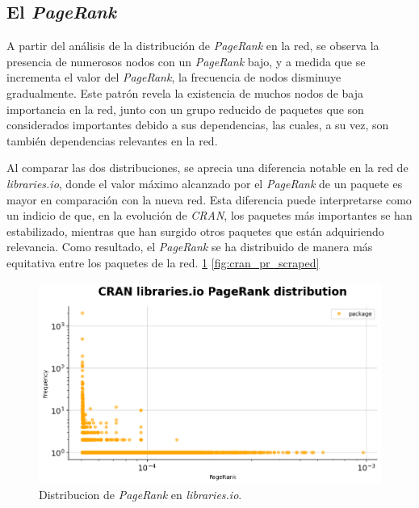 \subsection{El \textit{PageRank}}

A partir del análisis de la distribución de \textit{PageRank} en la red, se observa la presencia
de numerosos nodos con un \textit{PageRank} bajo, y a medida que se incrementa el valor del
\textit{PageRank}, la frecuencia de nodos disminuye gradualmente. Este patrón revela la
existencia de muchos nodos de baja importancia en la red, junto con un grupo reducido de
paquetes que son considerados importantes debido a sus dependencias, las cuales, a su vez,
son también dependencias relevantes en la red.

Al comparar las dos distribuciones, se aprecia una diferencia notable en la red
de \textit{libraries.io}, donde el valor máximo alcanzado por el \textit{PageRank} de
un paquete es mayor en comparación con la nueva red. Esta diferencia puede interpretarse
como un indicio de que, en la evolución de \textit{CRAN}, los paquetes más importantes
se han estabilizado, mientras que han surgido otros paquetes que están adquiriendo
relevancia. Como resultado, el \textit{PageRank} se ha distribuido de manera más equitativa
entre los paquetes de la red. \ref{fig:cran_pr_libio} \ref{fig:cran_pr_scraped}

\begin{figure}[h!]
    \begin{center}
        \includegraphics[width=1\textwidth]{img/cran/pr.png}
        \caption{Distribucion de \textit{PageRank} en \textit{libraries.io}.}
        \label{fig:cran_pr_libio}
    \end{center}
\end{figure}

